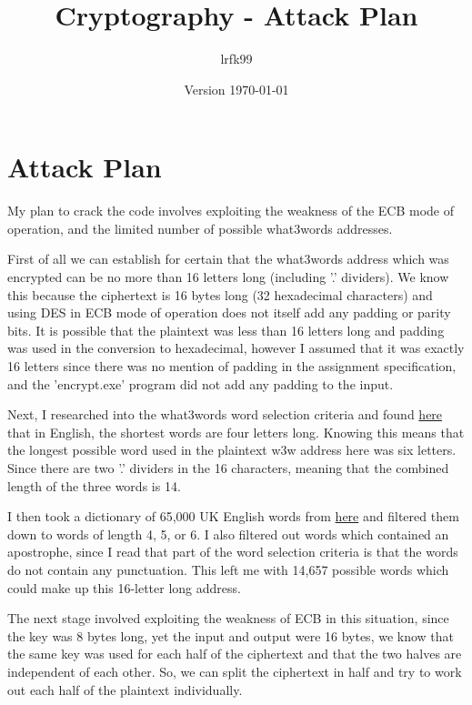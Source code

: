 \documentclass[a4paper, 11pt]{article}
\title{Cryptography - Attack Plan}
\date{Version \today}
\author{lrfk99}
\begin{document}
\maketitle

\section{Attack Plan}
 
My plan to crack the code involves exploiting the weakness of the ECB mode of operation, and the limited number of possible what3words addresses.

First of all we can establish for certain that the what3words address which was encrypted can be no more than 16 letters long (including '.' dividers). 
We know this because the ciphertext is 16 bytes long (32 hexadecimal characters) and using DES in ECB mode of operation does not itself add any padding or parity bits. 
It is possible that the plaintext was less than 16 letters long and padding was used in the conversion to hexadecimal, 
however I assumed that it was exactly 16 letters since there was no mention of padding in the assignment specification, 
and the 'encrypt.exe' program did not add any padding to the input.

Next, I researched into the what3words word selection criteria and found \href{https://support.what3words.com/en/articles/2212810-what-are-the-shortest-and-longest-words-used}{here}
that in English, the shortest words are four letters long. 
Knowing this means that the longest possible word used in the plaintext w3w address here was six letters. 
Since there are two '.' dividers in the 16 characters, meaning that the combined length of the three words is 14.

I then took a dictionary of 65,000 UK English words from \href{http://gwicks.net/dictionaries.htm}{here} and filtered them down to words of length 4, 5, or 6. 
I also filtered out words which contained an apostrophe, since I read that part of the word selection criteria is that the words do not contain any punctuation. 
This left me with 14,657 possible words which could make up this 16-letter long address. 

The next stage involved exploiting the weakness of ECB in this situation, since the key was 8 bytes long, yet the input and output were 16 bytes, 
we know that the same key was used for each half of the ciphertext and that the two halves are independent of each other. 
So, we can split the ciphertext in half and try to work out each half of the plaintext individually. 
\end{document}
